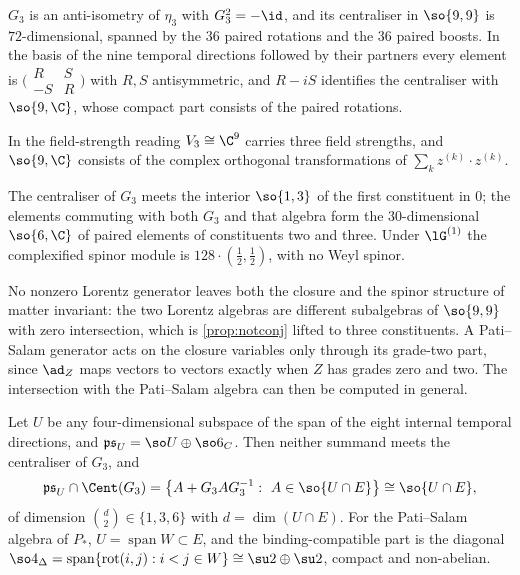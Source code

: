 \begin{theorem}
\label{thm:so9C}
$G_3$ is an anti-isometry of $\eta_3$ with $G_3^2=-\id$, and its centraliser in $\so{9,9}$ is $72$-dimensional, spanned by the $36$ paired rotations
and the $36$ paired boosts. In the basis of the nine temporal directions followed by their partners every element is
$\bigl(\begin{smallmatrix}R&S\\-S&R\end{smallmatrix}\bigr)$ with $R,S$ antisymmetric, and $R-iS$ identifies the centraliser with $\so{9,\C}$, whose
compact part consists of the paired rotations.
\end{theorem}

In the field-strength reading $V_3\cong\C^9$ carries three field strengths, and $\so{9,\C}$ consists of the complex orthogonal transformations of
$\sum_kz^{(k)}\cdot z^{(k)}$.

\begin{theorem}
\label{thm:nocommon}
The centraliser of $G_3$ meets the interior $\so{1,3}$ of the first constituent in $0$; the elements commuting with both $G_3$ and that algebra form
the $30$-dimensional $\so{6,\C}$ of paired elements of constituents two and three. Under $\lG^{(1)}$ the complexified spinor module is
$128\cdot(\tfrac12,\tfrac12)$, with no Weyl spinor.
\end{theorem}

No nonzero Lorentz generator leaves both the closure and the spinor structure of matter invariant: the two Lorentz algebras are different
subalgebras of $\so{9,9}$ with zero intersection, which is \cref{prop:notconj} lifted to three constituents. A Pati--Salam generator acts on the
closure variables only through its grade-two part, since $\ad_Z$ maps vectors to vectors exactly when $Z$ has grades zero and two. The intersection
with the Pati--Salam algebra can then be computed in general.

\begin{theorem}
\label{thm:PSbinding}
Let $U$ be any four-dimensional subspace of the span of the eight internal temporal directions, and $\mathfrak{ps}_U=\so U\oplus\so6_C$. Then neither
summand meets the centraliser of $G_3$, and
\[
\mathfrak{ps}_U\cap\Cent(G_3)=\bigl\{A+G_3AG_3^{-1}:\ A\in\so{U\cap E}\bigr\}\cong\so{U\cap E},
\]
of dimension $\binom d2\in\{1,3,6\}$ with $d=\dim(U\cap E)$. For the Pati--Salam algebra of $P_*$, $U=\operatorname{span}W\subset E$, and the
binding-compatible part is the diagonal $\so4_\Delta=\operatorname{span}\{\mathrm{rot}(i,j):i<j\in W\}\cong\su2\oplus\su2$, compact and non-abelian.
\end{theorem}

